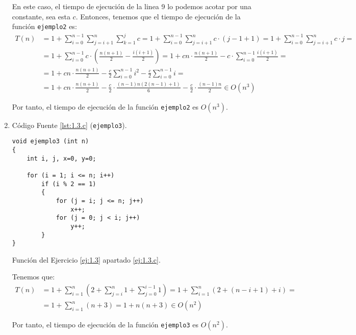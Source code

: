 \begin{ejercicio}
\begin{enumerate}
        En este caso, el tiempo de ejecución de la linea 9 lo podemos acotar por una constante, sea esta $c$.
        Entonces, tenemos que el tiempo de ejecución de la función \verb|ejemplo2| es:
        \begin{align*}
            T(n)&= 1 + \sum_{i=0}^{n-1} \sum_{j=i+1}^{n} \sum_{k=1}^{j} c
            = 1 + \sum_{i=0}^{n-1} \sum_{j=i+1}^{n} c\cdot (j-1+1)
            = 1 + \sum_{i=0}^{n-1} \sum_{j=i+1}^{n} c\cdot j
            =\\&= 1 + \sum_{i=0}^{n-1} c\cdot \left(\frac{n(n+1)}{2} - \frac{i(i+1)}{2}\right)
            = 1 + cn\cdot \frac{n(n+1)}{2} - c\cdot \sum_{i=0}^{n-1} \frac{i(i+1)}{2} =\\
            &= 1 + cn\cdot \frac{n(n+1)}{2} - \frac{c}{2}\sum_{i=0}^{n-1} i^2 - \frac{c}{2}\sum_{i=0}^{n-1} i =\\
            &= 1 + cn\cdot \frac{n(n+1)}{2} - \frac{c}{2}\cdot \frac{(n-1)n(2(n-1)+1)}{6} - \frac{c}{2}\cdot \frac{(n-1)n}{2} \in O(n^3)
        \end{align*}

        Por tanto, el tiempo de ejecución de la función \verb|ejemplo2| es $O(n^3)$.

        \item \label{ej:1.3.c} Código Fuente \ref{lst:1.3.c} (\verb|ejemplo3|).
        \begin{listing}[H]
            \begin{verbatim}
void ejemplo3 (int n)
{
    int i, j, x=0, y=0;

    for (i = 1; i <= n; i++)
        if (i % 2 == 1)
        {
            for (j = i; j <= n; j++)
                x++;
            for (j = 0; j < i; j++)
                y++;
        }
}
            \end{verbatim}
            \caption{Función del Ejercicio \ref{ej:1.3} apartado \ref{ej:1.3.c}.}
            \label{lst:1.3.c}
        \end{listing}

        Tenemos que:
        \begin{align*}
            T(n)&= 1 + \sum_{i=1}^{n} \left(2 + \sum_{j=i}^{n} 1 + \sum_{j=0}^{i-1} 1\right)
            = 1 + \sum_{i=1}^{n} \left(2 + (n-i+1) + i\right)
            =\\&= 1 + \sum_{i=1}^{n} (n+3) = 1 + n(n+3) \in O(n^2)
        \end{align*}

        Por tanto, el tiempo de ejecución de la función \verb|ejemplo3| es $O(n^2)$.


\end{enumerate}
\end{ejercicio}
